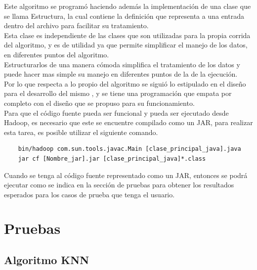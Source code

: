 Este algoritmo se programó haciendo además la implementación de una clase que se llama Estructura, la cual contiene la definición que representa a una entrada dentro del archivo para facilitar su tratamiento. \\
Esta clase es independiente de las clases que son utilizadas para la propia corrida del algoritmo, y es de utilidad ya que permite simplificar el manejo de los datos, en diferentes puntos del algoritmo.\\
Estructurarlos de una manera cómoda simplifica el tratamiento de los datos y puede hacer mas simple su manejo en diferentes puntos de la de la ejecución.\\
Por lo que respecta a lo propio del algoritmo se siguió lo estipulado en el diseño para el desarrollo del mismo , y se tiene una programación que empata por completo con el diseño que se propuso para su funcionamiento. \\
Para que el código fuente pueda ser funcional y pueda ser ejecutado desde Hadoop, es necesario que este se encuentre compilado como un JAR, para realizar esta tarea, es posible utilizar el siguiente comando. 
 \begin{verbatim}
 	bin/hadoop com.sun.tools.javac.Main [clase_principal_java].java
 	jar cf [Nombre_jar].jar [clase_principal_java]*.class
 \end{verbatim}
 Cuando se tenga al código fuente representado como un JAR, entonces se podrá ejecutar como se indica en la sección de pruebas para obtener los resultados esperados para los casos de prueba que tenga el usuario.
\section{Pruebas} \label{pruebasalgoritmos}
\subsection{Algoritmo KNN}
